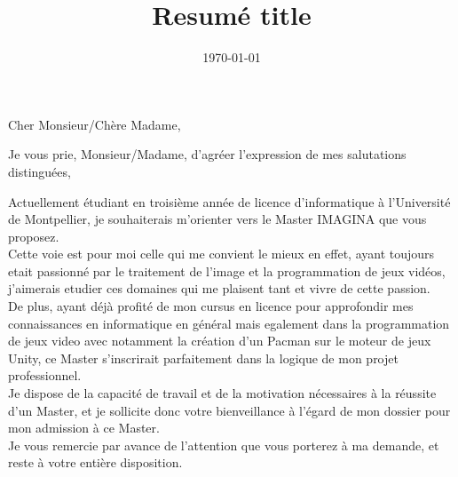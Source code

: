 \documentclass[11pt,a4paper,sans]{moderncv}        %
\title{Resumé title}                               %
\begin{document}
\date{\today}
\opening{Cher Monsieur/Chère Madame,}
\closing{Je vous prie, Monsieur/Madame, d’agréer l’expression de mes salutations distinguées,}
\makelettertitle


Actuellement étudiant en troisième année de licence d’informatique à l’Université de
Montpellier, je souhaiterais m’orienter vers le Master IMAGINA que vous proposez.\\

Cette voie est pour moi celle qui me convient le mieux en effet, ayant 
toujours etait passionné par le traitement de l'image et la programmation de jeux vidéos, 
j’aimerais etudier ces domaines qui me plaisent tant et vivre de cette passion.\\

De plus, ayant déjà profité de mon cursus en licence pour approfondir mes
connaissances en informatique en général mais egalement dans la programmation de jeux video avec notamment 
la création d'un Pacman sur le moteur de jeux Unity, ce Master s’inscrirait parfaitement dans la logique de mon
projet professionnel.\\

Je dispose de la capacité de travail et de la motivation nécessaires à la réussite d’un
Master, et je sollicite donc votre bienveillance à l’égard de mon dossier pour mon admission à
ce Master.\\

Je vous remercie par avance de l’attention que vous porterez à ma demande, et reste à votre
entière disposition.\\

\vspace{1\baselineskip}

\makeletterclosing
\end{document}
